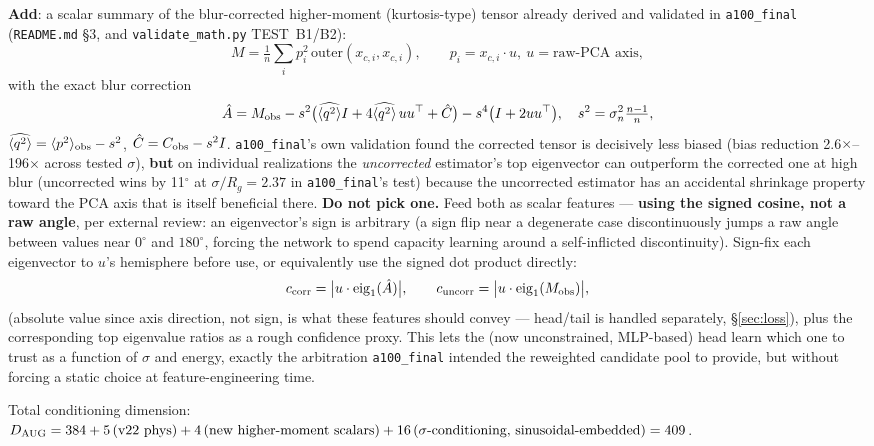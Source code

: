 \documentclass[11pt]{article}
\newcommand{\code}[1]{\texttt{#1}}
\begin{document}
\textbf{Add}: a scalar summary of the blur-corrected higher-moment (kurtosis-type) tensor
already derived and validated in \code{a100\_final} (\code{README.md} \S3, and
\code{validate\_math.py} TEST~B1/B2):
\[
  M = \tfrac{1}{n}\textstyle\sum_i p_i^2\, \mathrm{outer}(x_{c,i}, x_{c,i}),
  \qquad p_i = x_{c,i}\cdot u,\ u = \text{raw-PCA axis},
\]
with the exact blur correction
\[
  \hat A = M_{\rm obs} - s^2\big(\widehat{\langle q^2\rangle} I + 4\widehat{\langle q^2\rangle}\, u u^\top + \hat C\big)
           - s^4\big(I + 2uu^\top\big),
  \quad s^2 = \sigma_n^2\tfrac{n-1}{n},
\]
$\widehat{\langle q^2\rangle}=\langle p^2\rangle_{\rm obs}-s^2$, $\hat C = C_{\rm obs} - s^2 I$.
\code{a100\_final}'s own validation found the corrected tensor is decisively less biased
(bias reduction 2.6$\times$--196$\times$ across tested $\sigma$), \textbf{but} on individual
realizations the \emph{uncorrected} estimator's top eigenvector can outperform the corrected
one at high blur (uncorrected wins by 11$^\circ$ at $\sigma/R_g{=}2.37$ in
\code{a100\_final}'s test) because the uncorrected estimator has an accidental shrinkage
property toward the PCA axis that is itself beneficial there. \textbf{Do not pick one.} Feed
both as scalar features --- \textbf{using the signed cosine, not a raw angle}, per external
review: an eigenvector's sign is arbitrary (a sign flip near a degenerate case discontinuously
jumps a raw angle between values near $0^\circ$ and $180^\circ$, forcing the network to spend
capacity learning around a self-inflicted discontinuity). Sign-fix each eigenvector to $u$'s
hemisphere before use, or equivalently use the signed dot product directly:
\[
  c_{\rm corr} = \big|u\cdot \mathrm{eig}_1(\hat A)\big|, \qquad
  c_{\rm uncorr} = \big|u\cdot \mathrm{eig}_1(M_{\rm obs})\big|,
\]
(absolute value since axis direction, not sign, is what these features should convey ---
head/tail is handled separately, \S\ref{sec:loss}), plus the corresponding top eigenvalue
ratios as a rough confidence proxy. This lets the (now unconstrained, MLP-based) head learn
which one to trust as a function of $\sigma$ and energy, exactly the arbitration
\code{a100\_final} intended the reweighted candidate pool to provide, but without forcing a
static choice at feature-engineering time.

Total conditioning dimension: $D_{\rm AUG} = 384 + 5\,(\text{v22 phys}) + 4\,(\text{new
higher-moment scalars}) + 16\,(\sigma\text{-conditioning, sinusoidal-embedded}) = 409$.
\end{document}
